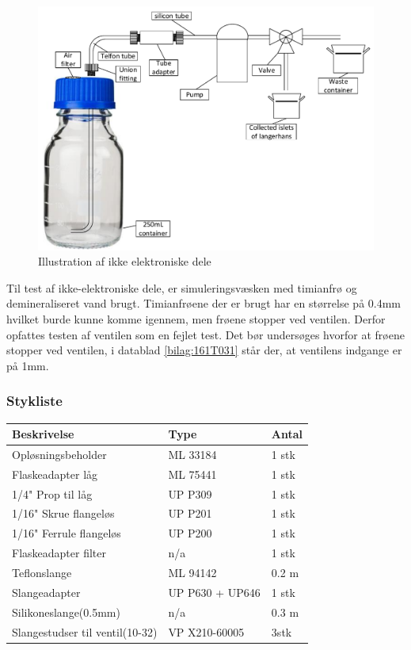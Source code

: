 \begin{figure}[H]
	\centering
	\includegraphics[width=1\textwidth]{billeder/Hardware/ikkeelektronisk.pdf}
	\caption{Illustration af ikke elektroniske dele}
	\label{fig:nonelectronic}
\end{figure}

Til test af ikke-elektroniske dele, er simuleringsvæsken med timianfrø og demineraliseret vand brugt. Timianfrøene der er brugt har en størrelse på 0.4mm hvilket burde kunne komme igennem, men frøene stopper ved ventilen. Derfor opfattes testen af ventilen som en fejlet test. Det bør undersøges hvorfor at frøene stopper ved ventilen, i datablad \ref{bilag:161T031} står der, at ventilens indgange er på 1mm. 

\newpage
\subsubsection{Stykliste} 
\begin{center}
		\begin{longtable}{ | m{6cm} | m{4cm}| m{2cm}| } 
			\hline
			\textbf{Beskrivelse} &\textbf{Type} & \textbf{Antal} \\ 
			\hline
			Opløsningsbeholder & ML 33184 & 1 stk \\ 
			\hline
			Flaskeadapter låg & ML 75441 & 1 stk \\ 
			\hline
			1/4" Prop til låg & UP P309 & 1 stk \\ 
			\hline
			1/16" Skrue flangeløs & UP P201 & 1 stk \\ 
			\hline
			1/16" Ferrule flangeløs & UP P200 & 1 stk \\ 
			\hline
			Flaskeadapter filter & n/a & 1 stk \\ 
			\hline	
			Teflonslange & ML 94142 & 0.2 m \\ 
			\hline
			Slangeadapter & UP P630 + UP646 & 1 stk \\ 
			\hline
			Silikoneslange(0.5mm) & n/a & 0.3 m \\ 
			\hline
			Slangestudser til ventil(10-32) & VP X210-60005 & 3stk \\ 
			\hline
		\end{longtable}
\end{center}

